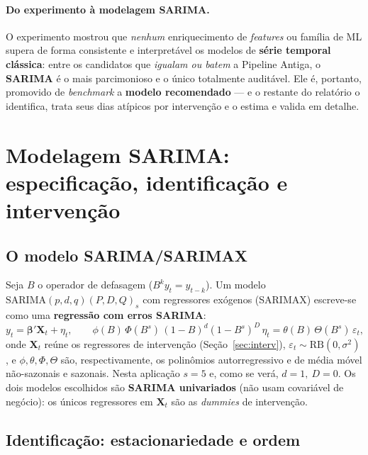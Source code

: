 \documentclass[11pt,a4paper]{article}
\begin{document}
\paragraph{Do experimento à modelagem SARIMA.} O experimento mostrou que \emph{nenhum} enriquecimento
de \emph{features} ou família de ML supera de forma consistente e interpretável os modelos de
\textbf{série temporal clássica}: entre os candidatos que \emph{igualam ou batem} a Pipeline
Antiga, o \textbf{SARIMA} é o mais parcimonioso e o único totalmente auditável. Ele é, portanto,
promovido de \emph{benchmark} a \textbf{modelo recomendado} --- e o restante do relatório o
identifica, trata seus dias atípicos por intervenção e o estima e valida em detalhe.

\section{Modelagem SARIMA: especificação, identificação e intervenção}
\label{sec:sarima-modelo}

\subsection{O modelo SARIMA/SARIMAX}
\label{sec:sarima}

Seja $B$ o operador de defasagem ($B^k y_t = y_{t-k}$). Um modelo
$\text{SARIMA}(p,d,q)(P,D,Q)_s$ com regressores exógenos (SARIMAX) escreve-se como uma
\textbf{regressão com erros SARIMA}:
\begin{equation}
y_t = \boldsymbol{\beta}'\mathbf{X}_t + \eta_t,
\qquad
\phi(B)\,\Phi(B^s)\,(1-B)^d(1-B^s)^D\,\eta_t = \theta(B)\,\Theta(B^s)\,\varepsilon_t,
\label{eq:sarimax}
\end{equation}
onde $\mathbf{X}_t$ reúne os regressores de intervenção (Seção~\ref{sec:interv}),
$\varepsilon_t \sim \text{RB}(0,\sigma^2)$, e $\phi,\theta,\Phi,\Theta$ são, respectivamente, os
polinômios autorregressivo e de média móvel não-sazonais e sazonais. Nesta aplicação $s=5$ e, como
se verá, $d=1,\ D=0$. Os dois modelos escolhidos são \textbf{SARIMA univariados} (não usam
covariável de negócio): os únicos regressores em $\mathbf{X}_t$ são as \emph{dummies} de
intervenção.

\subsection{Identificação: estacionariedade e ordem}
\label{sec:ident}
\end{document}
